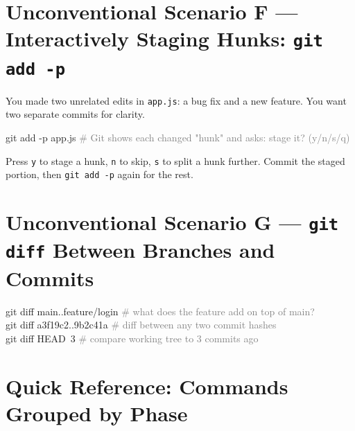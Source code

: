 \documentclass[10pt,a4paper]{article}
\newenvironment{codebox}{%
  \begin{mdframed}[backgroundcolor=codebg, linewidth=0pt,
    innerleftmargin=6pt, innerrightmargin=6pt,
    innertopmargin=4pt, innerbottommargin=4pt]%
  \small\ttfamily
}{%
  \end{mdframed}%
}
\newcommand{\cmd}[1]{\texttt{\small #1}}
\begin{document}
\section{Unconventional Scenario F --- Interactively Staging Hunks: \texttt{git add -p}}

You made two unrelated edits in \texttt{app.js}: a bug fix and a new feature.
You want two separate commits for clarity.

\begin{codebox}
git add -p app.js       \textcolor{gray}{\# Git shows each changed "hunk" and asks: stage it? (y/n/s/q)}
\end{codebox}

Press \texttt{y} to stage a hunk, \texttt{n} to skip, \texttt{s} to split a hunk further.
Commit the staged portion, then \cmd{git add -p} again for the rest.

\section{Unconventional Scenario G --- \texttt{git diff} Between Branches and Commits}

\begin{codebox}
git diff main..feature/login            \textcolor{gray}{\# what does the feature add on top of main?}\\
git diff a3f19c2..9b2c41a              \textcolor{gray}{\# diff between any two commit hashes}\\
git diff HEAD~3                         \textcolor{gray}{\# compare working tree to 3 commits ago}
\end{codebox}

\section{Quick Reference: Commands Grouped by Phase}
\end{document}
